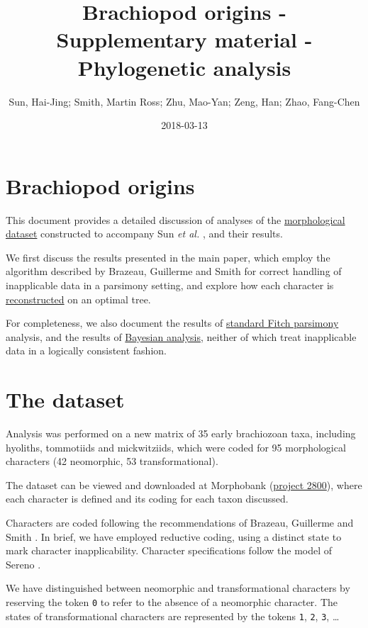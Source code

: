 \documentclass[]{book}
\title{Brachiopod origins - Supplementary material - Phylogenetic analysis}
\author{Sun, Hai-Jing; Smith, Martin Ross; Zhu, Mao-Yan; Zeng, Han; Zhao,
Fang-Chen}
\date{2018-03-13}
\theoremstyle{definition}
\theoremstyle{definition}
\theoremstyle{definition}
\theoremstyle{remark}
\begin{document}
\maketitle

{
\setcounter{tocdepth}{1}
\tableofcontents
}
\hypertarget{brachiopod-origins}{%
\chapter*{Brachiopod origins}\label{brachiopod-origins}}

This document provides a detailed discussion of analyses of the
\protect\hyperlink{dataset}{morphological dataset} constructed to
accompany Sun \emph{et al.} \citeyearpar{Sun2018}, and their results.

We first discuss the results presented in the main paper, which employ
the algorithm described by Brazeau, Guillerme and Smith
\citeyearpar{Brazeau2018} for correct handling of inapplicable data in a
parsimony setting, and explore how each character is
\protect\hyperlink{reconstructions}{reconstructed} on an optimal tree.

For completeness, we also document the results of
\protect\hyperlink{tnt}{standard Fitch parsimony} analysis, and the
results of \protect\hyperlink{MrBayes}{Bayesian analysis}, neither of
which treat inapplicable data in a logically consistent fashion.

\hypertarget{the-dataset}{%
\chapter{The dataset}\label{the-dataset}}

Analysis was performed on a new matrix of 35 early brachiozoan taxa,
including hyoliths, tommotiids and mickwitziids, which were coded for 95
morphological characters (42 neomorphic, 53 transformational).

The dataset can be viewed and downloaded at Morphobank
(\href{https://morphobank.org/permalink/?P2800}{project 2800}), where
each character is defined and its coding for each taxon discussed.

Characters are coded following the recommendations of Brazeau, Guillerme
and Smith \citep{Brazeau2018}. In brief, we have employed reductive
coding, using a distinct state to mark character inapplicability.
Character specifications follow the model of Sereno
\citeyearpar{Sereno2007}.

We have distinguished between neomorphic and transformational characters
\citep[sensu][]{Sereno2007} by reserving the token \texttt{0} to refer
to the absence of a neomorphic character. The states of transformational
characters are represented by the tokens \texttt{1}, \texttt{2},
\texttt{3}, \ldots{}
\end{document}

